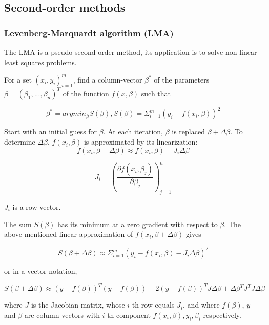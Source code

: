 \subsection*{Second-order methods}
\subsubsection*{Levenberg-Marquardt algorithm (LMA)}

The LMA is a pseudo-second order method, its application is to solve non-linear least squares problems.

For a set $(x_i, y_i)^{m}_{i=1}$, find a column-vector $\beta^{*}$ of the parameters $\beta = (\beta_1, ..., \beta_n)^T$ of the function $f(x, \beta)$ such that

\begin{equation*}
    \beta^{*} = arg min_{\beta} S(\beta), S(\beta) = \Sigma_{i=1}^m (y_i - f(x_i, \beta))^2
\end{equation*}

Start with an initial guess for $\beta$. At each iteration, $\beta$ is replaced  $\beta + \Delta \beta$. To determine $\Delta \beta$, $f(x_i, \beta)$ is approximated by its linearization:
\begin{equation*}
    f(x_i, \beta + \Delta \beta) \approx f(x_i, \beta) + J_i \Delta \beta
\end{equation*}

\begin{equation*}
    J_i = (\frac{\partial f(x_i, \beta_j)}{\partial \beta_j})_{j=1}^n
\end{equation*}

$J_i$ is a row-vector.

The sum $S(\beta)$ has its minimum at a zero gradient with respect to $\beta$. The above-mentioned linear approximation of $f(x_i, \beta + \Delta \beta)$ gives

\begin{equation*}
    S(\beta + \Delta \beta) \approx \Sigma_{i=1}^m (y_i - f(x_i, \beta) - J_i \Delta \beta)^2
\end{equation*}

or in a vector notation,

\begin{equation*}
    S(\beta + \Delta \beta) \approx (y - f(\beta))^T(y - f(\beta)) - 2(y - f(\beta))^TJ\Delta \beta + \Delta \beta^TJ^TJ\Delta\beta
\end{equation*}

where $J$ is the Jacobian matrix, whose $i$-th row equals $J_i$, and where $f(\beta)$, $y$ and $\beta$ are column-vectors with $i$-th component $f(x_i, \beta), y_i, \beta_i$ respectively.

